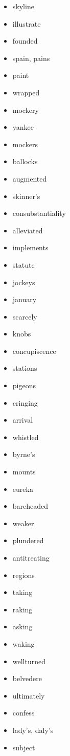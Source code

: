 \documentclass{article}
\begin{document}
\begin{itemize}
    \item skyline
    \item illustrate
    \item founded
    \item spain, pains
    \item paint
    \item wrapped
    \item mockery
    \item yankee
    \item mockers
    \item ballocks
    \item augmented
    \item skinner's
    \item consubstantiality
    \item alleviated
    \item implements
    \item statute
    \item jockeys
    \item january
    \item scarcely
    \item knobs
    \item concupiscence
    \item stations
    \item pigeons
    \item cringing
    \item arrival
    \item whistled
    \item byrne's
    \item mounts
    \item eureka
    \item bareheaded
    \item weaker
    \item plundered
    \item antitreating
    \item regions
    \item taking
    \item raking
    \item asking
    \item waking
    \item wellturned
    \item belvedere
    \item ultimately
    \item confess
    \item lady's, daly's
    \item subject

\end{itemize}
\end{document}
